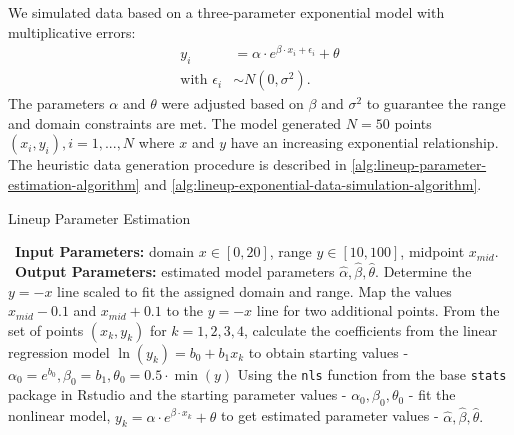 \documentclass[12pt]{article}
\begin{document}
We simulated data based on a three-parameter exponential model with
multiplicative errors: \begin{align}
y_i & = \alpha\cdot e^{\beta\cdot x_i + \epsilon_i} + \theta \\
\text{with } \epsilon_i & \sim N(0, \sigma^2). \nonumber
\end{align} The parameters \(\alpha\) and \(\theta\) were adjusted based
on \(\beta\) and \(\sigma^2\) to guarantee the range and domain
constraints are met. The model generated \(N = 50\) points
\((x_i, y_i), i = 1,...,N\) where \(x\) and \(y\) have an increasing
exponential relationship. The heuristic data generation procedure is
described in \cref{alg:lineup-parameter-estimation-algorithm} and
\cref{alg:lineup-exponential-data-simulation-algorithm}.

\begin{algorithm}
  \caption{Lineup Parameter Estimation}\label{alg:lineup-parameter-estimation-algorithm}
  \begin{algorithmic}[1]
    \Statex \hspace*{-1em}\textbullet~\textbf{Input Parameters:} domain $x\in[0,20]$, range $y\in[10,100]$, midpoint $x_{mid}$.
    \Statex \hspace*{-1em}\textbullet~\textbf{Output Parameters:} estimated model parameters $\hat\alpha, \hat\beta, \hat\theta$.
    \State Determine the $y=-x$ line scaled to fit the assigned domain and range.
    \State Map the values $x_{mid} - 0.1$ and $x_{mid} + 0.1$ to the $y=-x$ line for two additional points.
    \State From the set of points $(x_k, y_k)$ for $k = 1,2,3,4$, calculate the coefficients from the linear regression model $\ln(y_k) = b_0 +b_1x_k$ to obtain starting values - $\alpha_0 = e^{b_0}, \beta_0 =  b_1, \theta_0 = 0.5\cdot \min(y)$
    \State Using the \texttt{nls} function from the base \texttt{stats} package in Rstudio and the starting parameter values - $\alpha_0, \beta_0, \theta_0$ - fit the nonlinear model, $y_k = \alpha\cdot e^{\beta\cdot x_k}+\theta$ to get estimated parameter values - $\hat\alpha, \hat\beta, \hat\theta.$
  \end{algorithmic}
\end{algorithm}
\end{document}

